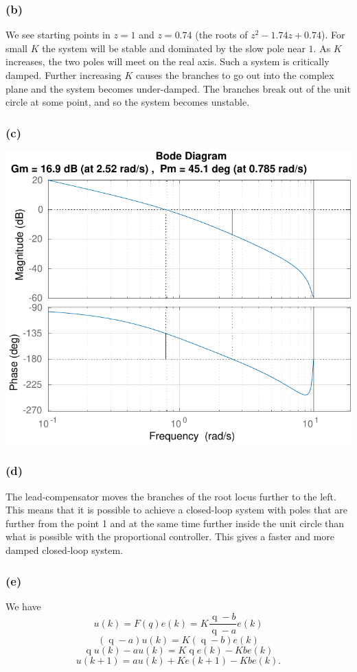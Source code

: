 \documentclass[letterpaper,12pt]{scrartcl}
\newcommand{\shift}{\ensuremath{\operatorname{q}}}
\begin{document}
\subsubsection*{(b)}
We see starting points in $z=1$ and $z=0.74$ (the roots of $z^2 - 1.74z + 0.74$). For small $K$ the system will be stable and dominated by the slow pole near $1$. As $K$ increases, the two poles will meet on the real axis. Such a system is critically damped. Further increasing $K$ causes the branches to go out into the complex plane and the system becomes under-damped. The branches break out of the unit circle at some point, and so the system becomes unstable.

\subsubsection*{(c)}
\begin{center}
\includegraphics[width=0.6\linewidth]{margin-diagram-crop}
\end{center}

\subsubsection*{(d)}
The lead-compensator moves the branches of the root locus further to the left. This means that it is possible to achieve a closed-loop system with poles that are further from the point 1 and at the same time further inside the unit circle than what is possible with the proportional controller. This gives a faster and more damped closed-loop system.

\subsubsection*{(e)}
We have
\[u(k) = F(q) e(k) = K\frac{\shift - b}{\shift - a}e(k) \]
\[ (\shift - a) u(k) =K (\shift - b) e(k)\]
\[ \shift u(k) - au(k) = K\shift e(k) - Kbe(k)\]
\[ u(k+1) = a u(k) + Ke(k+1) - Kb e(k).\]
\end{document}
